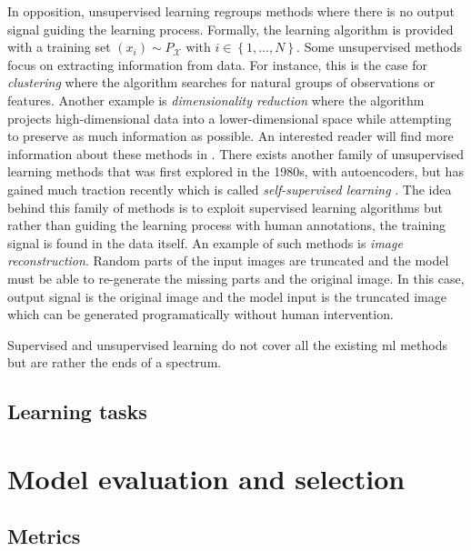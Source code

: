 In opposition, unsupervised learning regroups methods where there is no output signal guiding the learning process. Formally, the learning algorithm is provided with a training set $(x_i) \sim P_{\mathcal{X}}$ with $i \in \left\{1,...,N\right\}$. Some unsupervised methods focus on extracting information from data. For instance, this is the case for \textit{clustering} where the algorithm searches for natural groups of observations or features. Another example is \textit{dimensionality reduction} where the algorithm projects high-dimensional data into a lower-dimensional space while attempting to preserve as much information as possible. An interested reader will find more information about these methods in \parencite{friedman2017elements}. There exists another family of unsupervised learning methods that was first explored in the 1980s, with autoencoders, but has gained much traction recently which is called \textit{self-supervised learning} \parencite{lecun2021self}. The idea behind this family of methods is to exploit supervised learning algorithms but rather than guiding the learning process with human annotations, the training signal is found in the data itself. An example of such methods is \textit{image reconstruction}. Random parts of the input images are truncated and the model must be able to re-generate the missing parts and the original image. In this case, output signal is the original image and the model input is the truncated image which can be generated programatically without human intervention.


Supervised and unsupervised learning do not cover all the existing \acrlong{ml} methods but are rather the ends of a spectrum.  


\subsection{Learning tasks}



\section{Model evaluation and selection}

\subsection{Metrics}

